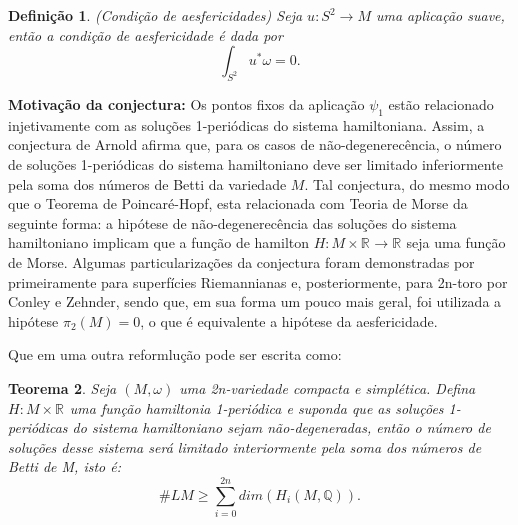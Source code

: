 \documentclass[12pt]{book}
\newtheorem{teorema}{Teorema}[section]
\newtheorem{definicao}[teorema]{Definição}
\newcommand{\real}[1]{\mathbb{R}^{#1}}
\begin{document}
	\begin{definicao}
		(Condição de aesfericidades) Seja $u:S^{2} \to M$ uma aplicação suave, então a condição de aesfericidade é dada por 
		$$
		\int_{S^{2}} u^{*}\omega = 0.
		$$
	\end{definicao}
	
	\textbf{Motivação da conjectura:} Os pontos fixos da aplicação $\psi_{1}$ estão relacionado injetivamente com as soluções 1-periódicas do sistema hamiltoniana. Assim, a conjectura de Arnold afirma que, para os casos de não-degenerecência, o número de soluções 1-periódicas do sistema hamiltoniano deve ser limitado inferiormente pela soma dos números de Betti da variedade $M$. Tal conjectura, do mesmo modo que o Teorema de Poincaré-Hopf, esta relacionada com Teoria de Morse da seguinte forma: a hipótese de não-degenerecência das soluções do sistema hamiltoniano implicam que a função de hamilton $H: M \times \real{} \to \real{}$ seja uma função de Morse. Algumas particularizações da conjectura foram demonstradas por primeiramente para superfícies Riemannianas e, posteriormente, para 2n-toro por Conley e Zehnder, sendo que, em sua forma um pouco mais geral, foi utilizada a hipótese $\pi_{2}(M)=0$, o que é equivalente a hipótese da aesfericidade.

	Que em uma outra reformlução pode ser escrita como:
	
	\begin{teorema}
		Seja $(M,\omega)$ uma 2n-variedade compacta e simplética. Defina $H:M\times \real{}$ uma função hamiltonia 1-periódica e suponda que as soluções 1-periódicas do sistema hamiltoniano sejam não-degeneradas, então o número de soluções desse sistema será limitado interiormente pela soma dos números de Betti de M, isto é:
		$$
		\#LM \geq \sum_{i=0}^{2n}dim(H_{i}(M, \mathbb{Q})).
		$$
	\end{teorema}
	
\end{document}
